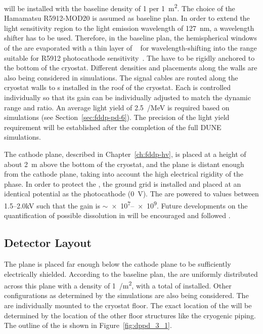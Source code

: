 will be installed with the baseline density of \num{1} per \SI{1}{m^2}. The choice of the Hamamatsu R5912-MOD20  %
is assumed as baseline plan. In order to extend the  light sensitivity region to the \lar light emission wavelength of \SI{127}{nm}, a wavelength shifter has to be used. Therefore, in the baseline plan, the hemispherical windows of the  are evaporated with a thin layer of ~\cite{tpb} for wavelength-shifting into the range suitable for R5912  photocathode sensitivity~\cite{hamamatsu-5912}. The  have to be rigidly anchored to the bottom of the cryostat. Different  densities and placements along the walls are also being considered in simulations. The  signal cables are routed along the cryostat walls to \fdth{}s installed in the roof of the cryostat. Each  is controlled individually so that its gain can be individually adjusted to match the  dynamic range and  ratio. An average light yield of \SI{2.5}{\phel/MeV} is required based on  simulations (see Section~\ref{sec:fddp-pd-6}). The precision of the light yield requirement will be established after the completion of the full DUNE simulations.

The cathode plane, described in Chapter~\ref{ch:fddp-hv}, %
 is placed at a height of about \SI{2}{m} above the bottom of the cryostat, and the  plane is distant enough from the cathode plane, taking into account the high electrical rigidity of the \lar phase. In order to protect the , the ground grid is installed and placed at an identical potential as the  photocathode (\SI{0}{V}). The  are powered to values between \numrange{1.5}{2.0}\si{kV} such that the  gain is $\sim$\numrange{e7}{e9}. Future developments on the quantification of possible  dissolution in \lar will be encouraged and followed \cite{TPBdiss}.

\subsection{Detector Layout}
\label{sec:fddp-pd-1.4}

The  plane is placed far enough below the cathode plane to be sufficiently electrically shielded. According to the baseline plan, the  are uniformly distributed across this plane with a density of \SI{1}{/m^2}, with a total of \dpnumpmtch {} installed. Other  configurations as determined by the simulations are also being considered. The  are individually mounted to the cryostat floor. The exact location of the  will be determined by the location of the other floor structures like the cryogenic piping. The outline of the  is shown in Figure~\ref{fig:dppd_3_1}.

